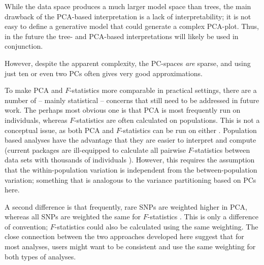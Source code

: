 \documentclass[12pt,a4pape, fullpage]{article}
\begin{document}
While the data space produces a much larger model space than trees, the main drawback of the PCA-based interpretation is a lack of interpretability; it is not easy to define a generative model that could generate a complex PCA-plot. Thus, in the future the tree- and PCA-based interpretations will likely be used in conjunction. 

 However, despite the apparent complexity, the PC-spaces \emph{are} sparse, and using just ten or even two PCs often gives very good approximations.






To make PCA and $F$-statistics more comparable in practical settings, there are a number of -- mainly statistical -- concerns that still need to be addressed in future work. The perhaps most obvious one is that PCA is most frequently run on individuals, whereas $F$-statistics are often calculated on populations. This is not a conceptual issue, as both PCA and $F$-statistics can be run on either \cite{cavalli-sforza1994}. Population based analyses have the advantage that they are easier to interpret and compute (current packages are ill-equipped to calculate all pairwise $F$-statistics between data sets with thousands of individuals \cite{patterson2012}). However, this requires the assumption that the within-population variation is independent from the between-population variation; something that is analogous to the variance partitioning based on PCs here. 

A second difference is that frequently, rare SNPs are weighted higher in PCA, whereas all SNPs are weighted the same for $F$-statistics \cite{patterson2006}. This is only a difference of convention; $F$-statistics could also be calculated using the same weighting. The close connection between the two approaches developed here suggest that for most analyses, users might want to be consistent and use the same weighting for both types of analyses. 
\end{document}
